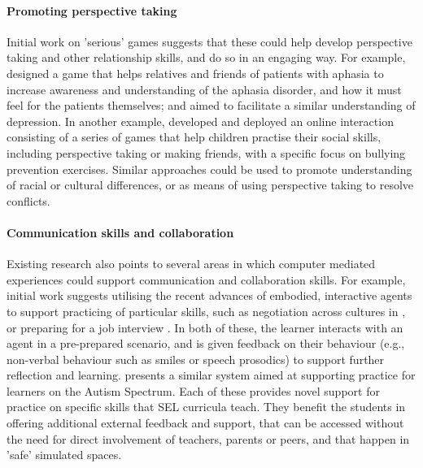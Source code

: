 \documentclass[prodmode,acmtochi]{acmsmall}
\newcommand{\rephrase}[1]{\textrm{\textrm{\textcolor{gray}{#1}}}}
\begin{document}
\paragraph{Promoting perspective taking} Initial work on 'serious' games suggests that these could help develop perspective taking and other relationship skills,  and do so in an engaging way. For example,  designed a game that helps relatives and friends of patients with aphasia to increase awareness and understanding of the aphasia disorder, and how it must feel for the patients themselves; and  aimed to facilitate a similar understanding of depression. In another example,  developed and deployed an online interaction consisting of a series of games that help children practise their social skills, including perspective taking or making friends, with a specific focus on bullying prevention exercises. Similar approaches could be used to promote understanding of racial or cultural differences, or as means of using perspective taking to resolve conflicts. %





\paragraph{Communication skills and collaboration} Existing research also points to several areas in which computer mediated experiences could support communication and collaboration skills. For example, initial work suggests utilising the recent advances of embodied, interactive agents to support practicing of particular skills, such as negotiation across cultures in \cite{Core2006}, or preparing for a job interview \cite{Hoque2013}. In both of these, the learner interacts with an agent in a pre-prepared scenario, and is given feedback on their behaviour (e.g., non-verbal behaviour such as smiles or speech prosodics) to support further reflection and learning.  presents a similar system aimed at supporting practice for learners on the Autism Spectrum. Each of these provides novel support for practice on specific skills that SEL curricula teach. They benefit the students in offering additional external feedback and support, that can be accessed without the need for direct involvement of teachers, parents or peers, and that happen in 'safe' simulated spaces.
%
\end{document}
